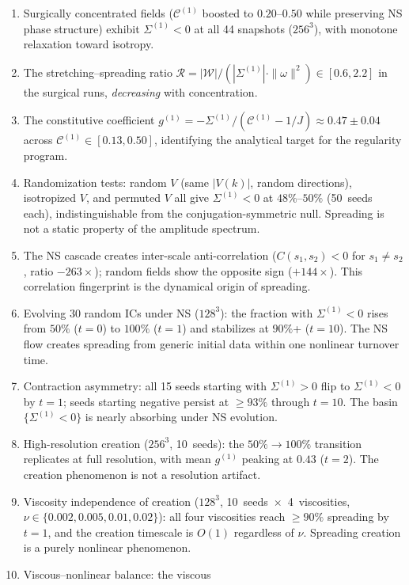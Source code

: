 \documentclass[11pt]{article}
\theoremstyle{definition}
\newcommand{\cC}{\mathcal{C}}
\begin{document}
\begin{enumerate}[leftmargin=2em,label=(N\arabic*)]
  for $f\leq 0.5$).
\item Surgically concentrated fields ($\cC^{(1)}$ boosted
  to $0.20$--$0.50$ while preserving NS phase structure)
  exhibit $\Sigma^{(1)}<0$ at all 44 snapshots ($256^3$),
  with monotone relaxation toward isotropy.
\item The stretching--spreading ratio
  $\mathcal{R}=|\mathcal{W}|/(|\Sigma^{(1)}|
  \cdot\|\omega\|^2)\in[0.6,2.2]$ in the surgical runs,
  \emph{decreasing} with concentration.
\item The constitutive coefficient $g^{(1)} =
  -\Sigma^{(1)}/(\cC^{(1)}-1/J) \approx 0.47\pm 0.04$
  across $\cC^{(1)}\in[0.13, 0.50]$, identifying the
  analytical target for the regularity program.
\item Randomization tests: random $V$ (same $|V(k)|$,
  random directions), isotropized $V$, and permuted $V$
  all give $\Sigma^{(1)}<0$ at $48\%$--$50\%$ (50~seeds
  each), indistinguishable from the
  conjugation-symmetric null.  Spreading is not a
  static property of the amplitude spectrum.
\item The NS cascade creates inter-scale
  anti-correlation ($C(s_1,s_2)<0$ for $s_1\neq s_2$,
  ratio $-263\times$); random fields show the opposite
  sign ($+144\times$).  This correlation fingerprint is
  the dynamical origin of spreading.
\item Evolving 30 random ICs under NS ($128^3$): the fraction with
  $\Sigma^{(1)}<0$ rises from $50\%$ ($t=0$) to $100\%$
  ($t=1$) and stabilizes at $90\%$+ ($t=10$).  The NS
  flow creates spreading from generic initial data within
  one nonlinear turnover time.
\item Contraction asymmetry: all 15 seeds starting with
  $\Sigma^{(1)}>0$ flip to $\Sigma^{(1)}<0$ by $t=1$;
  seeds starting negative persist at $\geq 93\%$
  through $t=10$.  The basin $\{\Sigma^{(1)}<0\}$ is
  nearly absorbing under NS evolution.
\item High-resolution creation ($256^3$, 10~seeds):
  the $50\%\to 100\%$ transition replicates at full
  resolution, with mean $g^{(1)}$ peaking at $0.43$
  ($t=2$).  The creation phenomenon is not a
  resolution artifact.
\item Viscosity independence of creation ($128^3$,
  10~seeds~$\times$~4~viscosities,
  $\nu\in\{0.002,0.005,0.01,0.02\}$):
  all four viscosities reach $\geq 90\%$ spreading
  by $t=1$, and the creation timescale is $O(1)$
  regardless of $\nu$.  Spreading creation is a purely
  nonlinear phenomenon.
\item Viscous--nonlinear balance: the viscous

\end{enumerate}
\end{document}
